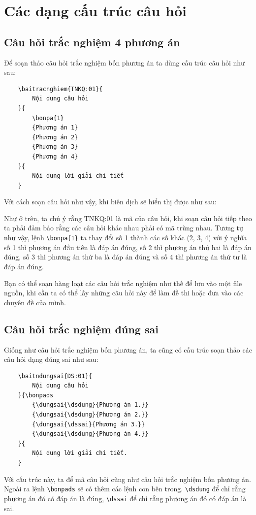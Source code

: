 \chapter{Các dạng cấu trúc câu hỏi}
\section{Câu hỏi trắc nghiệm 4 phương án}
Để soạn thảo câu hỏi trắc nghiệm bốn phương án ta dùng cấu trúc câu hỏi như sau:
\begin{verbatim}
	\baitracnghiem{TNKQ:01}{
		Nội dung câu hỏi
	}{
		\bonpa{1}
		{Phương án 1}
		{Phương án 2}
		{Phương án 3}
		{Phương án 4}
	}{
		Nội dung lời giải chi tiết
	}
\end{verbatim}

Với cách soạn câu hỏi như vậy, khi biên dịch sẽ hiển thị được như sau:
\indebailoigiai
\setcounter{socauhoi}{0}
\begin{enumerate}[]
	\foreachproblem[tracnghiem]{\item\causo\thisproblem}
\end{enumerate}

Như ở trên, ta chú ý rằng TNKQ:01 là mã của câu hỏi, khi soạn câu hỏi tiếp theo ta phải đảm bảo rằng các câu hỏi khác nhau phải có mã trùng nhau. Tương tự như vậy, lệnh \verb'\bonpa{1}' ta thay đổi số 1 thành các số khác (2, 3, 4) với ý nghĩa số 1 thì phương án đầu tiên là đáp án đúng, số 2 thì phương án thứ hai là đáp án đúng, số 3 thì phương án thứ ba là đáp án đúng và số 4 thì phương án thứ tư là đáp án đúng.

Bạn có thể soạn hàng loạt các câu hỏi trắc nghiệm như thế để lưu vào một file nguồn, khi cần ta có thể lấy những câu hỏi này để làm đề thi hoặc đưa vào các chuyên đề của mình.

\section{Câu hỏi trắc nghiệm đúng sai}
Giống như câu hỏi trắc nghiệm bốn phương án, ta cũng có cấu trúc soạn thảo các câu hỏi dạng đúng sai như sau:
\begin{verbatim}
	\baitndungsai{DS:01}{
		Nội dung câu hỏi
	}{\bonpads
		{\dungsai{\dsdung}{Phương án 1.}}
		{\dungsai{\dsdung}{Phương án 2.}}
		{\dungsai{\dssai}{Phương án 3.}}
		{\dungsai{\dsdung}{Phương án 4.}}
	}{
		Nội dung lời giải chi tiết.
	}
\end{verbatim}

Với cấu trúc này, ta để mã câu hỏi cũng như câu hỏi trắc nghiệm bốn phương án. Ngoài ra lệnh \verb'\bonpads' sẽ có thêm các lệnh con bên trong. \verb'\dsdung' để chỉ rằng phương án đó có đáp án là đúng, \verb'\dssai' để chỉ rằng phương án đó có đáp án là sai.

